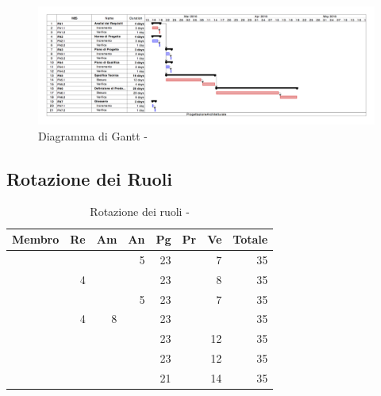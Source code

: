 \documentclass[12pt,a4paper]{article}
\begin{document}
\begin{center}
	\begin{figure}[H]
		\centering
		\includegraphics[width=\textwidth]{GanttProgettazioneArchitetturale.png}
		\caption{Diagramma di Gantt - \FPA}
	\end{figure}
\end{center}

\subsection{Rotazione dei Ruoli}

\begin{table}[H]
	\begin{center}
		\begin{tabular}{l r r r r r r r}
			\toprule
			\textbf{Membro}	&	\textbf{Re}	&	\textbf{Am}	& \textbf{An} & \textbf{Pg} & \textbf{Pr} & \textbf{Ve} & \textbf{Totale}\\
			\midrule
			\midrule
			\IB & & & 5 & 23 & & 7 & 35 \\
			\midrule
			\AB & 4 & & & 23 & & 8 & 35 \\
			\midrule
			\NDC & & & 5 & 23 & & 7 & 35 \\
			\midrule
			\TP & 4 & 8 & & 23 & & & 35 \\
			\midrule
			\WS & & & & 23 & & 12 & 35 \\
			\midrule
			\AVE & & & & 23 & & 12 & 35 \\
			\midrule
			\AVI & & & & 21 & & 14 & 35 \\
			\bottomrule
		\end{tabular}
		\caption{Rotazione dei ruoli - \FPA}
	\end{center}
\end{table}
\end{document}
